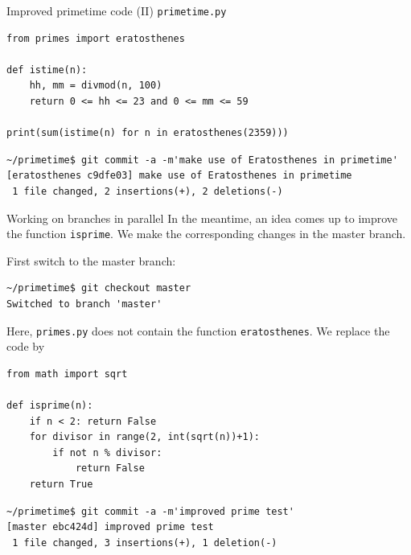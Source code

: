 \documentclass[svgnames]{beamer}
\begin{document}
\begin{frame}[fragile]{Improved primetime code (II)}
 \addtolength\linewidth{0.7truecm}
 \texttt{primetime.py}
 \begin{lstlisting}
from primes import eratosthenes

def istime(n):
    hh, mm = divmod(n, 100)
    return 0 <= hh <= 23 and 0 <= mm <= 59

print(sum(istime(n) for n in eratosthenes(2359)))
 \end{lstlisting}
 \begin{lstlisting}
~/primetime$ git commit -a -m'make use of Eratosthenes in primetime'
[eratosthenes c9dfe03] make use of Eratosthenes in primetime
 1 file changed, 2 insertions(+), 2 deletions(-)
 \end{lstlisting}
\end{frame}

\begin{frame}[fragile]{Working on branches in parallel}
 In the meantime, an idea comes up to improve the function \texttt{isprime}.
 We make the corresponding changes in the master branch.

 First switch to the master branch:
 \begin{lstlisting}
~/primetime$ git checkout master
Switched to branch 'master'
 \end{lstlisting}

 Here, \texttt{primes.py} does not contain the function \texttt{eratosthenes}.
 We replace the code by
 \begin{lstlisting}
from math import sqrt

def isprime(n):
    if n < 2: return False
    for divisor in range(2, int(sqrt(n))+1):
        if not n % divisor:
            return False
    return True
 \end{lstlisting}
 \begin{lstlisting}
~/primetime$ git commit -a -m'improved prime test'
[master ebc424d] improved prime test
 1 file changed, 3 insertions(+), 1 deletion(-)
 \end{lstlisting}
\end{frame}
\end{document}
